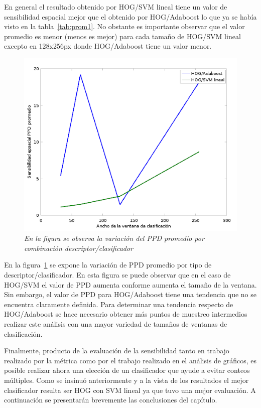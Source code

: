 
En general el resultado obtenido por HOG/SVM lineal tiene un valor de sensibilidad espacial mejor que el obtenido por HOG/Adaboost lo que ya se había visto en la tabla~\ref{tab:prom1}. No obstante es importante observar que el valor promedio es menor (menos es mejor) para  cada tamaño de HOG/SVM lineal excepto en 128x256px donde HOG/Adaboost tiene un valor menor. 

\begin{figure}[H]
  \centering
  \includegraphics[scale=.5]{images/ssp}
  \caption{\em  En la figura se observa la variación del PPD promedio por combinación descriptor/clasificador}  
  \label{fig:ssp}
\end{figure}

En la figura~\ref{fig:ssp} se expone la variación de PPD promedio por tipo de descriptor/clasificador. En esta figura se puede observar que en el caso de HOG/SVM el valor de PPD aumenta conforme aumenta el tamaño de la ventana. Sin embargo, el valor de PPD para HOG/Adaboost tiene una tendencia que no se encuentra claramente definida. Para determinar una tendencia respecto de HOG/Adaboost se hace necesario obtener más puntos de muestreo intermedios \ie realizar este análisis con una mayor variedad de tamaños de ventanas de clasificación.

Finalmente, producto de la evaluación de la sensibilidad tanto en trabajo realizado por la métrica como por el trabajo realizado en el análisis de gráficos, es posible realizar ahora una elección de un clasificador que ayude a evitar conteos múltiples. Como se insinuó anteriormente y a la vista de los resultados el mejor clasificador resulta ser HOG con SVM lineal ya que tuvo una mejor evaluación. 
A continuación se presentarán brevemente las conclusiones del capítulo.

